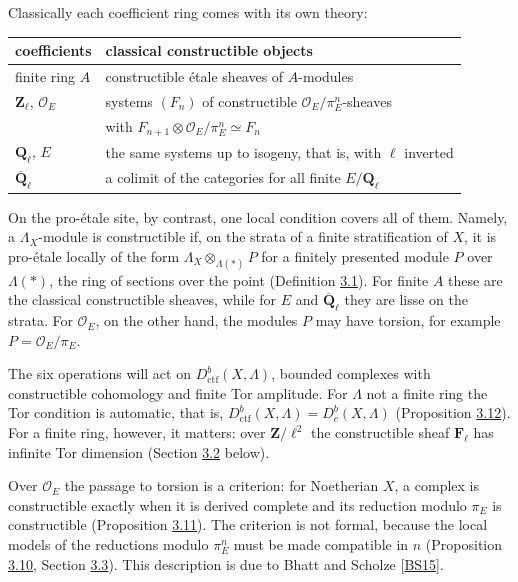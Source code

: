 \documentclass[11pt]{article}
\providecommand{\Dbc}{}\renewcommand{\Dbc}{D^b_c}
\begin{document}
Classically each coefficient ring comes with its own theory:

\begin{center}\small
\begin{tabularx}{\linewidth}{>{\raggedright\arraybackslash}X>{\raggedright\arraybackslash}X}
\toprule
coefficients & classical constructible objects \\
\midrule
finite ring \(A\) & constructible étale sheaves of \(A\)-modules \\
\(\mathbf Z_\ell\), \(\mathcal O_E\) & systems \((F_n)\) of constructible   \(\mathcal O_E/\pi_E^n\)-sheaves \\
 & with \(F_{n+1}\otimes\mathcal O_E/\pi_E^n\simeq F_n\) \\
\(\mathbf Q_\ell\), \(E\) & the same systems up to isogeny, that is, with \(\ell\) inverted \\
\(\overline{\mathbf Q}_\ell\) & a colimit of the categories for all finite \(E/\mathbf Q_\ell\) \\
\bottomrule
\end{tabularx}
\end{center}

On the pro-étale site, by contrast, one local condition covers all of them. Namely, a \(\Lambda_X\)-module is constructible if, on the strata of a finite stratification of \(X\), it is pro-étale locally of the form \(\Lambda_X\otimes_{\Lambda(*)}P\) for a finitely presented module \(P\) over \(\Lambda(*)\), the ring of sections over the point (Definition \hyperref[bp7]{3.1}). For finite \(A\) these are the classical constructible sheaves, while for \(E\) and \(\overline{\mathbf Q}_\ell\) they are lisse on the strata. For \(\mathcal O_E\), on the other hand, the modules \(P\) may have torsion, for example \(P=\mathcal O_E/\pi_E\).

The six operations will act on \(D^b_{\mathrm{ctf}}(X,\Lambda)\), bounded complexes with constructible cohomology and finite Tor amplitude. For \(\Lambda\) not a finite ring the Tor condition is automatic, that is, \(D^b_{\mathrm{ctf}}(X,\Lambda)=\Dbc(X,\Lambda)\) (Proposition \hyperref[bp40]{3.12}). For a finite ring, however, it matters: over \(\mathbf Z/\ell^2\) the constructible sheaf \(\mathbf F_\ell\) has infinite Tor dimension (Section \hyperref[bp5]{3.2} below).

Over \(\mathcal O_E\) the passage to torsion is a criterion: for Noetherian \(X\), a complex is constructible exactly when it is derived complete and its reduction modulo \(\pi_E\) is constructible (Proposition \hyperref[bp34]{3.11}). The criterion is not formal, because the local models of the reductions modulo \(\pi_E^n\) must be made compatible in \(n\) (Proposition \hyperref[bp31]{3.10}, Section \hyperref[bp13]{3.3}). This description is due to Bhatt and Scholze [\hyperref[bp93]{BS15}].
\end{document}
